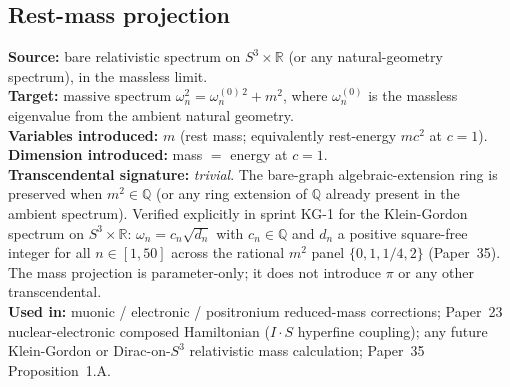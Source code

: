 \documentclass[11pt]{article}
\begin{document}
\subsection{Rest-mass projection}
\label{sec:proj_restmass}
\textbf{Source:} bare relativistic spectrum on $S^3 \times \mathbb{R}$
(or any natural-geometry spectrum), in the massless limit.\\
\textbf{Target:} massive spectrum
$\omega_n^2 = \omega_n^{(0)\,2} + m^2$, where $\omega_n^{(0)}$ is the
massless eigenvalue from the ambient natural geometry.\\
\textbf{Variables introduced:} $m$ (rest mass; equivalently rest-energy
$mc^2$ at $c=1$).\\
\textbf{Dimension introduced:} mass $=$ energy at $c=1$.\\
\textbf{Transcendental signature:} \textit{trivial}.  The bare-graph
algebraic-extension ring is preserved when $m^2 \in \mathbb{Q}$ (or
any ring extension of $\mathbb{Q}$ already present in the ambient
spectrum).  Verified explicitly in sprint KG-1 for the Klein-Gordon
spectrum on $S^3 \times \mathbb{R}$: $\omega_n = c_n \sqrt{d_n}$ with
$c_n \in \mathbb{Q}$ and $d_n$ a positive square-free integer for all
$n \in [1, 50]$ across the rational $m^2$ panel
$\{0, 1, 1/4, 2\}$ (Paper~35).  The mass projection is parameter-only;
it does not introduce $\pi$ or any other transcendental.\\
\textbf{Used in:} muonic / electronic / positronium reduced-mass
corrections; Paper~23 nuclear-electronic composed Hamiltonian
($I \cdot S$ hyperfine coupling); any future Klein-Gordon or
Dirac-on-$S^3$ relativistic mass calculation; Paper~35
Proposition~1.A.
\end{document}
